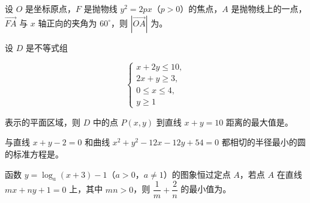 \begin{question}
设 $O$ 是坐标原点，$F$ 是抛物线 $y^2=2px$（$p>0$）的焦点，$A$ 是抛物线上的一点，$\overrightarrow{FA}$ 与 $x$ 轴正向的夹角为 $60^\circ$，则 $\left|\overrightarrow{OA}\right|$ 为\gkblank{}。

\end{question}
\begin{question}
设 $D$ 是不等式组

\nopagebreak[4]
\[\begin{cases}
x+2y\leqslant10,\\
2x+y\geqslant3,\\
0\leqslant x\leqslant4,\\
y\geqslant1
\end{cases}\]

表示的平面区域，则 $D$ 中的点 $P(x,y)$ 到直线 $x+y=10$ 距离的最大值是\gkblank{}。

\end{question}
\begin{question}
与直线 $x+y-2=0$ 和曲线 $x^2+y^2-12x-12y+54=0$ 都相切的半径最小的圆的标准方程是\gkblank{}。

\end{question}
\begin{question}
函数 $y=\log_a(x+3)-1$（$a>0$，$a\neq1$）的图象恒过定点 $A$，若点 $A$ 在直线 $mx+ny+1=0$ 上，其中 $mn>0$，则 $\dfrac1m+\dfrac2n$ 的最小值为\gkblank{}。

\end{question}

